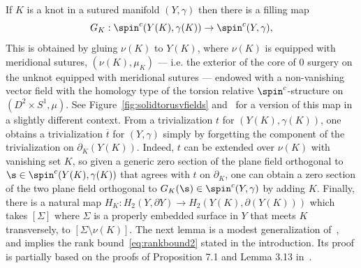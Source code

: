 \documentclass{amsart}
\theoremstyle{definition}
\theoremstyle{remark}
\numberwithin{equation}{section}
\begin{document}
If $K$ is a knot in a sutured manifold $(Y,\gamma)$ then there is a filling map $${G_K:\spin^c(Y(K),\gamma(K))\to\spin^c(Y,\gamma)},$$ This is obtained by gluing $\nu(K)$ to $Y(K)$, where $\nu(K)$ is equipped with meridional sutures, $(\nu(K),\mu_K)$ --- i.e. the exterior of the core of $0$ surgery on the unknot equipped with meridional sutures --- endowed with a non-vanishing vector field with the homology type of the torsion relative $\spin^c$-structure on $(D^2\times S^1,\mu)$. See Figure~\ref{fig:solidtorusvfields} and~\cite[Section 3.7]{HolomorphicdiskslinkinvariantsandthemultivariableAlexanderpolynomial} for a version of this map in a slightly different context. From a trivialization $t$ for $(Y(K),\gamma(K))$, one obtains a trivialization $\overline{t}$ for $(Y,\gamma)$ simply by forgetting the component of the trivialization on $\partial_K(Y(K))$. Indeed, $t$ can be extended over $\nu(K)$ with vanishing set $K$, so given a generic zero section of the plane field orthogonal to $\s\in \spin^c(Y(K),\gamma(K))$ that agrees with $t$ on $\partial_K$, one can obtain a zero section of the two plane field orthogonal to $G_K(\s)\in\spin^c(Y,\gamma)$ by adding $K$.  Finally, there is a natural map $H_K: H_2(Y,\partial Y)\to H_2(Y(K),\partial(Y(K)))$ which takes $[\Sigma]$ where $\Sigma$ is a properly embedded surface in $Y$ that meets $K$ transversely, to $[\Sigma\setminus\nu(K)]$. The next lemma is a modest generalization of~\cite[Lemma 3.13]{HolomorphicdiskslinkinvariantsandthemultivariableAlexanderpolynomial}, and implies the rank bound~\ref{eq:rankbound2} stated in the introduction. Its proof is partially based on the proofs of Proposition 7.1 and Lemma 3.13 in~\cite{HolomorphicdiskslinkinvariantsandthemultivariableAlexanderpolynomial}.
\end{document}
